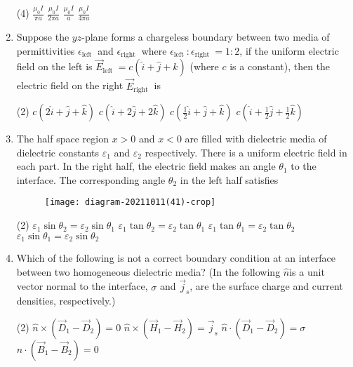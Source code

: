 \begin{enumerate}
	{}	
	\begin{tasks}(4)
		\task[\textbf{a.}]$\frac{\mu_{0} I}{\pi a}$
		\task[\textbf{b.}]$\frac{\mu_{0} I}{2 \pi a}$
		\task[\textbf{c.}]$\frac{\mu_{0} I}{a}$
		\task[\textbf{d.}]  $\frac{\mu_{0} I}{4 \pi a}$
	\end{tasks}	
	\item Suppose the $y z$-plane forms a chargeless boundary between two media of permittivities $\epsilon_{\text {left }}$ and $\epsilon_{\text {right }}$ where $\epsilon_{\text {left }}: \epsilon_{\text {right }}=1: 2$, if the uniform electric field on the left is $\vec{E}_{\text {left }}=c(\hat{i}+\hat{j}+\hat{k})$ (where $c$ is a constant), then the electric field on the right $\vec{E}_{\text {right }}$ is
	{}
	\begin{tasks}(2)
		\task[\textbf{A.}]  $c(2 \hat{i}+\hat{j}+\hat{k})$
		\task[\textbf{B.}] $c(\hat{i}+2 \hat{j}+2 \hat{k})$
		\task[\textbf{C.}] $c\left(\frac{1}{2} \hat{i}+\hat{j}+\hat{k}\right)$
		\task[\textbf{D.}] $c\left(\hat{i}+\frac{1}{2} \hat{j}+\frac{1}{2} \hat{k}\right)$
	\end{tasks}
	\item  The half space region $x>0$ and $x<0$ are filled with dielectric media of dielectric constants $\varepsilon_{1}$ and $\varepsilon_{2}$ respectively. There is a uniform electric field in each part. In the right half, the electric field makes an angle $\theta_{1}$ to the interface. The corresponding angle $\theta_{2}$ in the left half satisfies
	{{}}
	\begin{figure}[H]
		\centering
		\texttt{[image: diagram-20211011(41)-crop]}
	\end{figure}
	\begin{tasks}(2)
		\task[\textbf{A.}] $\varepsilon_{1} \sin \theta_{2}=\varepsilon_{2} \sin \theta_{1}$
		\task[\textbf{B.}] $\varepsilon_{1} \tan \theta_{2}=\varepsilon_{2} \tan \theta_{1}$
		\task[\textbf{C.}] $\varepsilon_{1} \tan \theta_{1}=\varepsilon_{2} \tan \theta_{2}$
		\task[\textbf{D.}] $\varepsilon_{1} \sin \theta_{1}=\varepsilon_{2} \sin \theta_{2}$
	\end{tasks}
	\item Which of the following is not a correct boundary condition at an interface between two homogeneous dielectric media? (In the following $\hat{n}$is a unit vector normal to the  interface, $\sigma$ and $\vec{j}_s$, are the surface charge and current densities, respectively.)
	{}
	\begin{tasks}(2)
		\task[\textbf{A.}] $\hat{n} \times\left(\vec{D}_{1}-\vec{D}_{2}\right)=0$
		\task[\textbf{B.}] $\hat{n} \times\left(\vec{H}_{1}-\vec{H}_{2}\right)=\vec{j}_{s}$
		\task[\textbf{C.}] $\hat{n} \cdot\left(\vec{D}_{1}-\vec{D}_{2}\right)=\sigma$
		\task[\textbf{D.}] $\hat{n} \cdot\left(\vec{B}_{1}-\vec{B}_{2}\right)=0$
	\end{tasks}
\end{enumerate}
